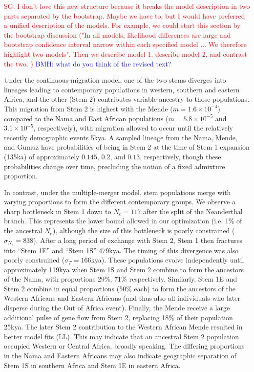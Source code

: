 \documentclass{article}
\newcommand{\sgcomment}[1]{{\textcolor{red}{SG: #1}}}
\newcommand{\bmhcomment}[1]{{\textcolor{blue}{BMH: #1}}}
\begin{document}
\sgcomment{I don't love this new structure because it breaks the model description in two parts separated by the bootstrap. Maybe we have to, but I would have preferred a unified description of the models. 
For example, we could start this section by the bootstrap discussion ("In all models, likelihood differences are large and bootstrap confidence interval narrow within each specified model ...  We therefore highlight two models".
Then we describe model 1, describe model 2, and contrast the two. 
 )} \bmhcomment{what do you think of the revised text?}
 
Under the continuous-migration model, one of the two stems diverges into
lineages leading to contemporary populations in western, southern and eastern
Africa, and the other (Stem 2) contributes variable ancestry to those
populations. This migration from Stem 2 is highest with the Mende
($m=1.6\times10^{-4}$) compared to the Nama and East African populations
($m=5.8\times10^{-5}$ and $3.1\times10^{-5}$, respectively), with migration
allowed to occur until the relatively recently demographic events 5kya. A
sampled lineage from the Nama, Mende, and Gumuz have probabilities of being in
Stem 2 at the time of Stem 1 expansion (135ka) of approximately $0.145$, $0.2$,
and $0.13$, respectively, though these probabilities change over time,
precluding the notion of a fixed admixture proportion.

In contrast, under the multiple-merger model, stem populations merge with
varying proportions to form the different contemporary groups. 
We observe a sharp bottleneck in Stem 1 down to $N_e=117$ after the split of
the Neanderthal branch. This represents the lower bound allowed in our
optimization (i.e. 1\% of the ancestral $N_e$), although the size of this
bottleneck is poorly constrained ($\sigma_{N_e}=838$). After a long period of
exchange with Stem 2, Stem 1 then fractures into “Stem 1E” and “Stem 1S”
479kya. The timing of this divergence was also poorly constrained ($\sigma_T=
166$kya). These populations evolve independently until approximately 119kya
when Stem 1S and Stem 2 combine to form the ancestors of the Nama, with
proportions 29\%, 71\% respectively. Similarly, Stem 1E and Stem 2 combine in
equal proportions (50\% each) to form the ancestors of the Western Africans and
Eastern Africans (and thus also all individuals who later disperse during the
Out of Africa event). Finally, the Mende receive a large additional pulse of
gene flow from Stem 2, replacing 18\% of their population 25kya. The later Stem
2 contribution to the Western African Mende resulted in better model fits (LL).
This may indicate that an ancestral Stem 2 population occupied Western or
Central Africa, broadly speaking. The differing proportions in the Nama and
Eastern Africans may also indicate geographic separation of Stem 1S in southern
Africa and Stem 1E in eastern Africa. 
\end{document}
